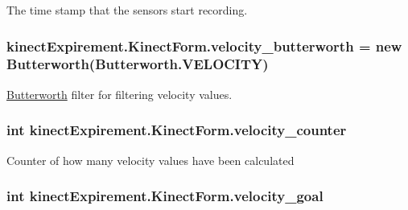The time stamp that the sensors start recording. 

\subsubsection[{\texorpdfstring{velocity\+\_\+butterworth}{velocity_butterworth}}]{ kinect\+Expirement.\+Kinect\+Form.\+velocity\+\_\+butterworth = new {\bf Butterworth}({\bf Butterworth.\+V\+E\+L\+O\+C\+I\+TY})}\hypertarget{classkinect_expirement_1_1_kinect_form_a7f1502bd90febb3137d8e4fdf71d52ec}{}\label{classkinect_expirement_1_1_kinect_form_a7f1502bd90febb3137d8e4fdf71d52ec}


\hyperlink{classkinect_expirement_1_1_butterworth}{Butterworth} filter for filtering velocity values. 

\subsubsection[{\texorpdfstring{velocity\+\_\+counter}{velocity_counter}}]{\setlength{\rightskip}{0pt plus 5cm}int kinect\+Expirement.\+Kinect\+Form.\+velocity\+\_\+counter}\hypertarget{classkinect_expirement_1_1_kinect_form_aedd93118198e798ee966ff768038bac1}{}\label{classkinect_expirement_1_1_kinect_form_aedd93118198e798ee966ff768038bac1}


Counter of how many velocity values have been calculated 

\subsubsection[{\texorpdfstring{velocity\+\_\+goal}{velocity_goal}}]{\setlength{\rightskip}{0pt plus 5cm}int kinect\+Expirement.\+Kinect\+Form.\+velocity\+\_\+goal}\hypertarget{classkinect_expirement_1_1_kinect_form_a6334825924ef2914544c0c96c0ad0572}{}\label{classkinect_expirement_1_1_kinect_form_a6334825924ef2914544c0c96c0ad0572}


